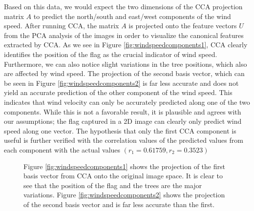 Based on this data, we would expect the two dimensions of the CCA projection matrix $A$ to predict the north/south and east/west components of the wind speed. After running CCA, the matrix $A$ is projected onto the feature vectors $U$ from the PCA analysis of the images in order to visualize the canonical features extracted by CCA. As we see in Figure \ref{fig:windspeedcomponents1}, CCA clearly identifies the position of the flag as the crucial indicator of wind speed. Furthermore, we can also notice slight variations in the tree positions, which also are affected by wind speed. The projection of the second basis vector, which can be seen in Figure \ref{fig:windspeedcomponents2} is far less accurate and does not yield an accurate prediction of the other component of the wind speed. This indicates that wind velocity can only be accurately predicted along one of the two components. While this is not a favorable result, it is plausible and agrees with our assumptions; the flag captured in a 2D image can clearly only predict wind speed along one vector. The hypothesis that only the first CCA component is useful is further verified with the correlation values of the predicted values from each component with the actual values $(r_1=0.61759, r_2=0.3523)$
\begin{figure}
	\centering
		\caption[CCA basis vectors for wind velocity projected onto the image space]{Figure \ref{fig:windspeedcomponents1} shows the projection of the first basis vector from CCA onto the original image space. It is clear to see that the position of the flag and the trees are the major variations. Figure \ref{fig:windspeedcomponents2} shows the projection of the second basis vector and is far less accurate than the first.}
\end{figure}

